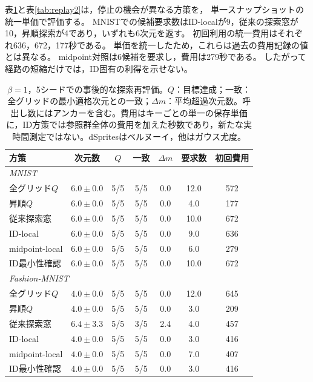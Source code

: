 \documentclass[11pt,a4paper]{ltjsarticle}
\begin{document}
表\ref{tab:replay1}と表\ref{tab:replay2}は，停止の機会が異なる方策を，
単一スナップショットの統一単価で評価する。
MNISTでの候補要求数はID-localが9，従来の探索窓が10，昇順探索が4であり，いずれも6次元を返す。
初回利用の統一費用はそれぞれ636，672，177秒である。
単価を統一したため，これらは過去の費用記録の値とは異なる。
midpoint対照は6候補を要求し，費用は279秒である。
したがって経路の短縮だけでは，ID固有の利得を示せない。

\begin{table}[H]
\caption{$\beta=1$，5シードでの事後的な探索再評価。$Q$：目標達成；一致：全グリッドの最小適格次元との一致；$\Delta m$：平均超過次元数。呼出し数にはアンカーを含む。費用はキーごとの単一の保存単価に，ID方策では参照群全体の費用を加えた秒数であり，新たな実時間測定ではない。dSpritesはベルヌーイ，他はガウス尤度。}\label{tab:replay1}
\small
\setlength{\tabcolsep}{3pt}
\begin{tabular*}{\textwidth}{@{\extracolsep{\fill}}lcccccc@{}}
\toprule
方策 & 次元数 & $Q$ & 一致 & $\Delta m$ & 要求数 & 初回費用 \\
\midrule
\multicolumn{7}{l}{\emph{MNIST}} \\
全グリッド$Q$ & $6.0 \pm 0.0$ & 5/5 & 5/5 & 0.0 & 12.0 & 572 \\
昇順$Q$ & $6.0 \pm 0.0$ & 5/5 & 5/5 & 0.0 & 4.0 & 177 \\
従来探索窓 & $6.0 \pm 0.0$ & 5/5 & 5/5 & 0.0 & 10.0 & 672 \\
ID-local & $6.0 \pm 0.0$ & 5/5 & 5/5 & 0.0 & 9.0 & 636 \\
midpoint-local & $6.0 \pm 0.0$ & 5/5 & 5/5 & 0.0 & 6.0 & 279 \\
ID最小性確認 & $6.0 \pm 0.0$ & 5/5 & 5/5 & 0.0 & 10.0 & 672 \\
\midrule
\multicolumn{7}{l}{\emph{Fashion-MNIST}} \\
全グリッド$Q$ & $4.0 \pm 0.0$ & 5/5 & 5/5 & 0.0 & 12.0 & 645 \\
昇順$Q$ & $4.0 \pm 0.0$ & 5/5 & 5/5 & 0.0 & 3.0 & 209 \\
従来探索窓 & $6.4 \pm 3.3$ & 5/5 & 3/5 & 2.4 & 4.0 & 457 \\
ID-local & $4.0 \pm 0.0$ & 5/5 & 5/5 & 0.0 & 3.0 & 416 \\
midpoint-local & $4.0 \pm 0.0$ & 5/5 & 5/5 & 0.0 & 7.0 & 407 \\
ID最小性確認 & $4.0 \pm 0.0$ & 5/5 & 5/5 & 0.0 & 3.0 & 416 \\
\bottomrule\end{tabular*}
\end{table}
\end{document}
